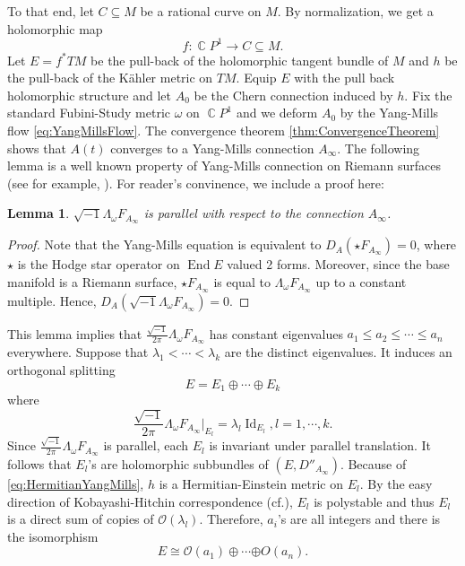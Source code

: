 \documentclass[11pt]{amsart}
\theoremstyle{plain}
\newtheorem{lem}[thm]{Lemma}
\theoremstyle{definition}
\numberwithin{equation}{section}
\DeclareMathOperator{\C}{\mathbb{C}}
\DeclareMathOperator{\End}{End}
\DeclareMathOperator{\Id}{Id}
\begin{document}
To that end, let $C\subseteq M$ be a rational curve on $M$. By normalization, we get a holomorphic map 
\[f:\C P^1\to C\subseteq M.\]
Let $E=f^*TM$ be the pull-back of the holomorphic tangent bundle of $M$ and $h$ be the pull-back of the K\"{a}hler metric on $TM$. Equip $E$ with the pull back holomorphic structure and let $A_0$ be the Chern connection induced by $h$. Fix the standard Fubini-Study metric $\omega$ on $\C P^1$ and we deform $A_0$ by the Yang-Mills flow \ref{eq:YangMillsFlow}. The convergence theorem \ref{thm:ConvergenceTheorem} shows that $A(t)$ converges to a Yang-Mills connection $A_\infty$. The following lemma is a well known property of Yang-Mills connection on Riemann surfaces (see for example, \cite{AB83}). For reader's convinence, we include a proof here:
\begin{lem}
    $\sqrt{-1}\Lambda_\omega F_{A_\infty}$ is parallel with respect to the connection $A_\infty$.
\end{lem}
\begin{proof}
    Note that the Yang-Mills equation is equivalent to $D_A(\star F_{A_\infty})=0$, where $\star$ is the Hodge star operator on $\End E$ valued 2 forms. Moreover, since the base manifold is a Riemann surface, $\star F_{A_\infty}$ is equal to $\Lambda_\omega F_{A_\infty}$ up to a constant multiple. Hence, $D_A(\sqrt{-1}\Lambda_\omega F_{A_\infty})=0$.
\end{proof}
This lemma implies that $\frac{\sqrt{-1}}{2\pi}\Lambda_\omega F_{A_\infty}$ has constant eigenvalues $a_1\leq a_2\leq\cdots\leq a_n$ everywhere. Suppose that $\lambda_1<\cdots<\lambda_k$ are the distinct eigenvalues. It induces an orthogonal splitting 
\begin{equation}
    E=E_1\oplus\cdots\oplus E_k
\end{equation}
where 
\begin{equation}\label{eq:HermitianYangMills}
    \frac{\sqrt{-1}}{2\pi}\Lambda_\omega F_{A_\infty}|_{E_l}=\lambda_l\Id_{E_l},l=1,\cdots,k.
\end{equation} 
Since $\frac{\sqrt{-1}}{2\pi}\Lambda_\omega F_{A_\infty}$ is parallel, each $E_l$ is invariant under parallel translation. It follows that $E_l$'s are holomorphic subbundles of $(E,D''_{A_\infty})$. Because of \ref{eq:HermitianYangMills}, $h$ is a Hermitian-Einstein metric on $E_l$. By the easy direction of Kobayashi-Hitchin correspondence (cf.\cite{Kob80,Lub83}), $E_l$ is polystable and thus $E_l$ is a direct sum of copies of $\mathcal{O}(\lambda_l)$. Therefore, $a_i$'s are all integers and there is the isomorphism \begin{equation}\label{eq:Splitting}
    E\cong\mathcal{O}(a_1)\oplus\cdots\mathcal\oplus{O}(a_n).
\end{equation}
\end{document}
